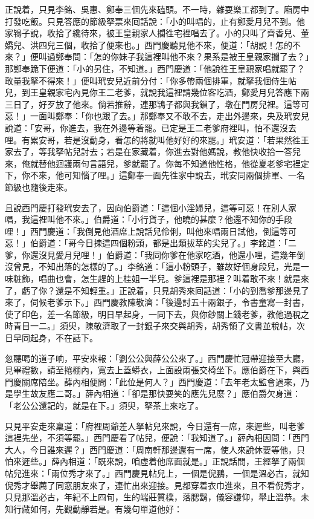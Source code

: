 正說着，只見李銘、吳惠、鄭奉三個先來磕頭。不一時，雜耍樂工都到了。廂房中打發吃飯。只見答應的節級拏票來囘話說：「小的叫唱的，止有鄭愛月兒不到。他家鴇子說，收拾了纔待來，被王皇親家人攔徃宅裡唱去了。小的只叫了齊香兒、董嬌兒、洪四兒三個，收拾了便來也。」西門慶聽見他不來，便道：「胡說！怎的不來？」便叫過鄭奉問：「怎的你妹子我這裡叫他不來？果系是被王皇親家攔了去？」那鄭奉跪下便道：「小的另住，不知道。」西門慶道：「他說徃王皇親家唱就罷了？敢量我拏不得來！」便叫玳安兒近前分付：「你多帶兩個排軍，就拏我個侍生帖兒，到王皇親家宅內見你王二老爹，就說我這裡請幾位客吃酒，鄭愛月兒答應下兩三日了，好歹放了他來。倘若推辭，連那鴇子都與我鎖了，墩在門房兒裡。這等可惡！」一面叫鄭奉：「你也跟了去。」那鄭奉又不敢不去，走出外邊來，央及玳安兒說道：「安哥，你進去，我在外邊等着罷。已定是王二老爹府裡叫，怕不還沒去哩。有累安哥，若是沒動身，看怎的將就叫他好好的來罷。」玳安道：「若果然徃王家去了，等我拏帖兒討去；若是在家藏着，你進去對他媽說，教他快收拾一答兒來，俺就替他迴護兩句言語兒，爹就罷了。你每不知道他性格，他從夏老爹宅裡定下，你不來，他可知惱了哩。」這鄭奉一面先徃家中說去，玳安同兩個排軍、一名節級也隨後走來。

且說西門慶打發玳安去了，因向伯爵道：「這個小淫婦兒，這等可惡！在別人家唱，我這裡叫他不來。」伯爵道：「小行貨子，他曉的甚麼？他還不知你的手段哩！」西門慶道：「我倒見他酒席上說話兒伶俐，叫他來唱兩日試他，倒這等可惡！」伯爵道：「哥今日揀這四個粉頭，都是出類拔萃的尖兒了。」李銘道：「二爹，你還沒見愛月兒哩！」伯爵道：「我同你爹在他家吃酒，他還小哩，這幾年倒沒曾見，不知出落的怎樣的了。」李銘道：「這小粉頭子，雖故好個身段兒，光是一味粧飾，唱曲也會，怎生趕的上桂姐一半兒。爹這裡是那裡？叫着敢不來！就是來了，虧了你？還是不知輕重。」正說着，只見胡秀來囘話道：「小的到喬爹那邊見了來了，伺候老爹示下。」西門慶教陳敬濟：「後邊討五十兩銀子，令書童寫一封書，使了印色，差一名節級，明日早起身，一同下去，與你鈔關上錢老爹，教他過稅之時青目一二。」須臾，陳敬濟取了一封銀子來交與胡秀，胡秀領了文書並稅帖，次日早同起身，不在話下。

忽聽喝的道子响，平安來報：「劉公公與薛公公來了。」西門慶忙冠帶迎接至大廳，見畢禮數，請至捲棚內，寬去上蓋蟒衣，上面設兩張交椅坐下。應伯爵在下，與西門慶關席陪坐。薛內相便問：「此位是何人？」西門慶道：「去年老太監會過來，乃是學生故友應二哥。」薛內相道：「卻是那快耍笑的應先兒麼？」應伯爵欠身道：「老公公還記的，就是在下。」須臾，拏茶上來吃了。

只見平安走來稟道：「府裡周爺差人拏帖兒來說，今日還有一席，來遲些，叫老爹這裡先坐，不須等罷。」西門慶看了帖兒，便說：「我知道了。」薛內相因問：「西門大人，今日誰來遲？」西門慶道：「周南軒那邊還有一席，使人來說休要等他，只怕來遲些。」薛內相道：「既來說，咱虛着他席面就是。」正說話間，王經拏了兩個帖兒進來：「兩位秀才來了。」西門慶見帖兒上，一個是倪鵬，一個是溫必古，就知倪秀才舉薦了同窓朋友來了，連忙出來迎接。見都穿着衣巾進來，且不看倪秀才，只見那溫必古，年紀不上四旬，生的端莊質樸，落腮鬍，儀容謙仰，舉止溫恭。未知行藏如何，先觀動靜若是。有幾句單道他好：


